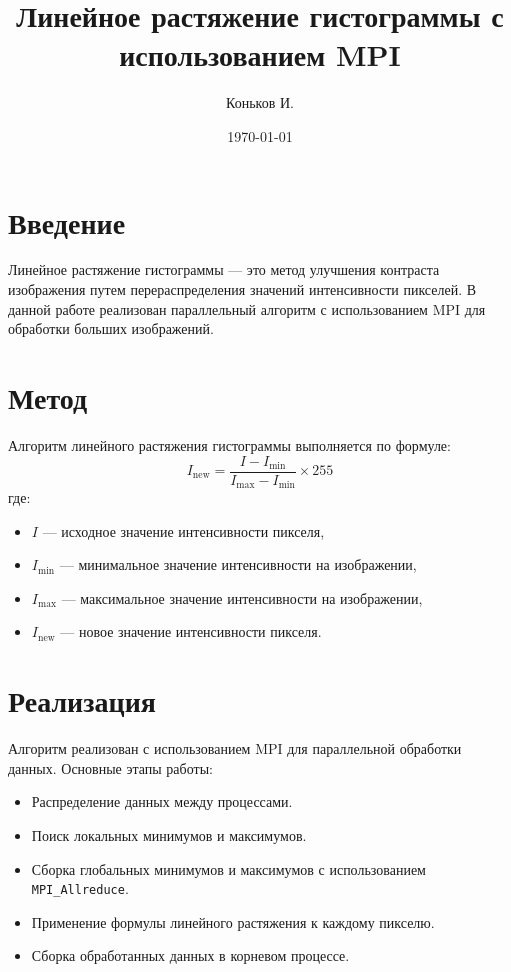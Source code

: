 \documentclass[12pt]{article}
\begin{document}
\title{Линейное растяжение гистограммы с использованием MPI}
\author{Коньков И.}
\date{\today}
\maketitle

\section*{Введение}
Линейное растяжение гистограммы — это метод улучшения контраста изображения путем перераспределения значений интенсивности пикселей. В данной работе реализован параллельный алгоритм с использованием MPI для обработки больших изображений.

\section*{Метод}
Алгоритм линейного растяжения гистограммы выполняется по формуле:
\[
I_{\text{new}} = \frac{I - I_{\text{min}}}{I_{\text{max}} - I_{\text{min}}} \times 255
\]
где:
\begin{itemize}
    \item \( I \) — исходное значение интенсивности пикселя,
    \item \( I_{\text{min}} \) — минимальное значение интенсивности на изображении,
    \item \( I_{\text{max}} \) — максимальное значение интенсивности на изображении,
    \item \( I_{\text{new}} \) — новое значение интенсивности пикселя.
\end{itemize}

\section*{Реализация}
Алгоритм реализован с использованием MPI для параллельной обработки данных. Основные этапы работы:
\begin{itemize}
    \item Распределение данных между процессами.
    \item Поиск локальных минимумов и максимумов.
    \item Сборка глобальных минимумов и максимумов с использованием \texttt{MPI\_Allreduce}.
    \item Применение формулы линейного растяжения к каждому пикселю.
    \item Сборка обработанных данных в корневом процессе.
\end{itemize}
\end{document}
